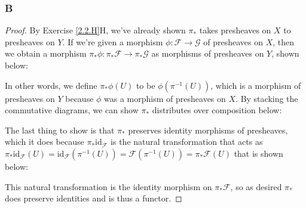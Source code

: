 \documentclass{article}
\newcommand{\id}{\mathrm{id}}
\newcommand{\fF}{\mathscr{F}}
\newcommand{\fG}{\mathscr{G}}
\newcommand{\fH}{\mathscr{H}}
\DeclareMathOperator{\res}{\mathrm{res}}
\begin{document}
\subsubsection{B}\label{2.3.B}
\begin{proof}
    By Exercise \ref{2.2.H}H, we've already shown $\pi_*$ takes presheaves on $X$ to presheaves on $Y$. If we're given a morphism $\phi:\fF\to \fG$ of presheaves on $X$, then we obtain a morphism $\pi_* \phi:\pi_* \fF\to \pi_* \fG$ as morphisms of presheaves on $Y$, shown below:
    \begin{center}
    \end{center}
    In other words, we define $\pi_*\phi(U)$ to be $\phi(\pi^{-1}(U))$, which is a morphism of presheaves on $Y$ because $\phi$ was a morphism of presheaves on $X$. By stacking the commutative diagrams, we can show $\pi_*$ distributes over composition below:
    \begin{center}
    \end{center}
    The last thing to show is that $\pi_*$ preserves identity morphisms of presheaves, which it does because $\pi_*\id_{\fF}$ is the natural transformation that acts as $\pi_*\id_{\fF}(U)=\id_{\fF}(\pi^{-1}(U))=\fF(\pi^{-1}(U))=\pi_*\fF(U)$ that is shown below:
    \begin{center}
    \end{center}
    This natural transformation is the identity morphism on $\pi_*\fF$, so as desired $\pi_*$ does preserve identities and is thus a functor.
\end{proof}
\end{document}
